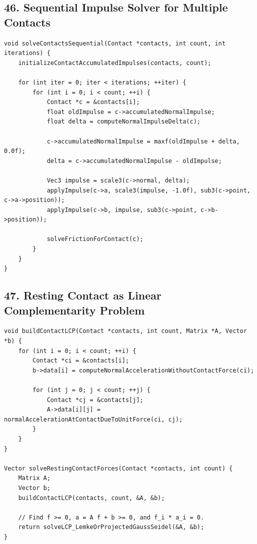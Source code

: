 \documentclass[10pt,letterpaper]{article}
\begin{document}
\subsection*{46. Sequential Impulse Solver for Multiple Contacts}

\begin{verbatim}
void solveContactsSequential(Contact *contacts, int count, int iterations) {
    initializeContactAccumulatedImpulses(contacts, count);

    for (int iter = 0; iter < iterations; ++iter) {
        for (int i = 0; i < count; ++i) {
            Contact *c = &contacts[i];
            float oldImpulse = c->accumulatedNormalImpulse;
            float delta = computeNormalImpulseDelta(c);

            c->accumulatedNormalImpulse = maxf(oldImpulse + delta, 0.0f);
            delta = c->accumulatedNormalImpulse - oldImpulse;

            Vec3 impulse = scale3(c->normal, delta);
            applyImpulse(c->a, scale3(impulse, -1.0f), sub3(c->point, c->a->position));
            applyImpulse(c->b, impulse, sub3(c->point, c->b->position));

            solveFrictionForContact(c);
        }
    }
}
\end{verbatim}

\subsection*{47. Resting Contact as Linear Complementarity Problem}

\begin{verbatim}
void buildContactLCP(Contact *contacts, int count, Matrix *A, Vector *b) {
    for (int i = 0; i < count; ++i) {
        Contact *ci = &contacts[i];
        b->data[i] = computeNormalAccelerationWithoutContactForce(ci);

        for (int j = 0; j < count; ++j) {
            Contact *cj = &contacts[j];
            A->data[i][j] = normalAccelerationAtContactDueToUnitForce(ci, cj);
        }
    }
}

Vector solveRestingContactForces(Contact *contacts, int count) {
    Matrix A;
    Vector b;
    buildContactLCP(contacts, count, &A, &b);

    // Find f >= 0, a = A f + b >= 0, and f_i * a_i = 0.
    return solveLCP_LemkeOrProjectedGaussSeidel(&A, &b);
}
\end{verbatim}
\end{document}
